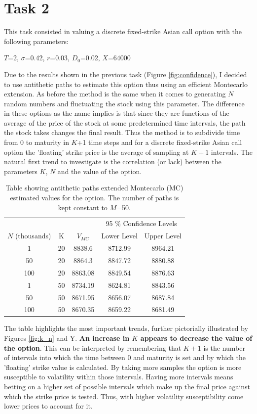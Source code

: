 \documentclass{article}
\begin{document}
\section*{Task 2}
This task consisted in valuing a discrete fixed-strike Asian call option with the following parameters:
\begin{flushleft}
$T$=2, $\sigma$=0.42, $r$=0.03, $D_0$=0.02, $X$=64000
\end{flushleft}
Due to the results shown in the previous task (Figure \ref{fig:confidence}), I decided to use antithetic paths to estimate this option thus using an efficient Montecarlo extension.
As before the method is the same when it comes to generating $N$ random numbers and fluctuating the stock using this parameter.
The difference in these options as the name implies is that since they are functions of the average of the price of the stock at some predetermined
time intervals, the path the stock takes changes the final result. Thus the method is to subdivide time from 0 to maturity in $K$+1 time steps and for a discrete fixed-strike Asian call option the 'floating' strike price is the average of sampling at $K+1$ intervals.
The natural first trend to investigate is the correlation (or lack) between the parameters $K$, $N$ and the value of the option.
\clearpage
\begin{table}[!h]
\centering
\begin{tabular}{c|c c c c}
 & & & \multicolumn{2}{c}{95 \% Confidence Levels} \\
\cline{4-5}
\makecell{$N$\\(thousands)} & K & $V_{MC}$ & Lower Level & Upper Level \\
\hline
1   & 20  & 8838.6 & 8712.99 & 8964.21      \\
50  & 20  & 8864.3 & 8847.72 & 8880.88     \\
100  & 20  & 8863.08&8849.54&8876.63      \\
1   & 50  & 8734.19&8624.81&8843.56      \\
50  & 50  & 8671.95&8656.07&8687.84       \\
100 & 50  & 8670.35&8659.22&8681.49       \\

\hline
\end{tabular}
\caption{Table showing antithetic paths extended Montecarlo (MC) estimated values for the option.
The number of paths is kept constant to $M$=50.}
\label{table:mc_comparisons}
\end{table}
The table highlights the most important trends, further pictorially illustrated by Figures \ref{fig:k_n} and Y.
\textbf{An increase in $K$ appears to decrease the value of the option}. This can be interpreted by remembering that $K+1$
is the number of intervals into which the time between 0 and maturity is set and by which the 'floating' strike value is
calculated. By taking more samples the option is more susceptible to volatility within those intervals. Having more intervals means
betting on a higher set of possible intervals which make up the final price against which the strike price is tested. Thus, with higher
volatility susceptibility come lower prices to account for it.
\end{document}
